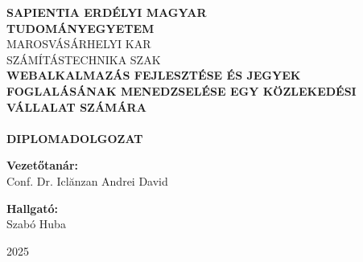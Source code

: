 \begin{titlepage}
    \centering
    \vspace*{2cm}

    {\Large \textbf{SAPIENTIA ERDÉLYI MAGYAR}}\\[0.2cm]
    {\Large \textbf{TUDOMÁNYEGYETEM}}\\[0.5cm]
    {\large MAROSVÁSÁRHELYI KAR}\\[0.2cm]
    {\large SZÁMÍTÁSTECHNIKA SZAK}\\[3cm]

    {\LARGE \textbf{WEBALKALMAZÁS FEJLESZTÉSE ÉS JEGYEK FOGLALÁSÁNAK MENEDZSELÉSE EGY KÖZLEKEDÉSI VÁLLALAT SZÁMÁRA}}\\[0.5cm] 
    {\Large \textbf{}}\\[0.5cm]
    {\LARGE \textbf{ DIPLOMADOLGOZAT}}\\[4cm]

    \noindent
    \begin{minipage}[t]{0.48\textwidth}
        \raggedright
        \textbf{Vezetőtanár:}\\[1em]
        Conf. Dr. Iclănzan Andrei David
    \end{minipage}
    \hfill
    \begin{minipage}[t]{0.48\textwidth}
        \raggedleft
        \textbf{Hallgató:}\\[1em]
        Szabó Huba
    \end{minipage}


    \vfill

    {\large  2025}

\end{titlepage}
